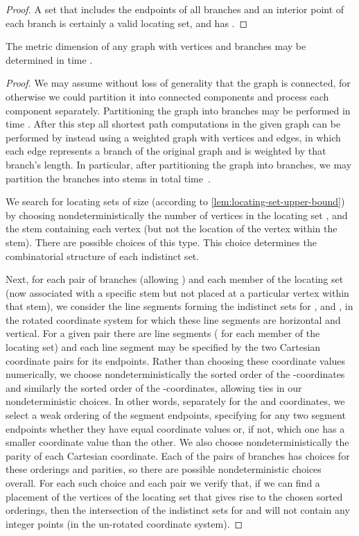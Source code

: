 \documentclass{jgaa-art}
\begin{document}
\begin{proof}
A set  that includes the endpoints of all branches and an interior point of each branch is certainly a valid locating set, and has .
\end{proof}

\begin{theorem}
The metric dimension of any graph with  vertices and  branches may be determined in time .
\end{theorem}

\begin{proof}
We may assume without loss of generality that the graph is connected, for otherwise we could partition it into connected components and process each component separately.
Partitioning the graph into branches may be performed in time . After this step all shortest path computations in the given graph can be performed by instead using a weighted graph with  vertices and edges, in which each edge represents a branch of the original graph and is weighted by that branch's length. In particular, after partitioning the graph into branches, we may partition the branches into stems in total time~.

We search for locating sets of size  (according to \autoref{lem:locating-set-upper-bound})
by choosing nondeterministically the number of vertices in the locating set , and the stem containing each vertex (but not the location of the vertex within the stem). There are  possible choices of this type. This choice determines the combinatorial structure of each indistinct set.

Next, for each pair  of branches (allowing ) and each member  of the locating set (now associated with a specific stem but not placed at a particular vertex within that stem), we consider the line segments forming the indistinct sets for ,  and , in the rotated coordinate system for which these line segments are horizontal and vertical. For a given pair  there are  line segments ( for each member of the locating set) and each line segment may be specified by the two Cartesian coordinate pairs for its endpoints. Rather than choosing these coordinate values numerically, we choose nondeterministically the sorted order of the -coordinates and similarly the sorted order of the -coordinates, allowing ties in our nondeterministic choices. In other words, separately for the  and  coordinates, we select a weak ordering of the segment endpoints, specifying for any two segment endpoints whether they have equal coordinate values or, if not, which one has a smaller coordinate value than the other.
We also choose nondeterministically the parity of each Cartesian coordinate.
Each of the  pairs of branches has  choices for these orderings and parities, so there are  possible nondeterministic choices overall.
For each such choice and each pair  we verify that, if we can find a placement of the vertices of the locating set that gives rise to the chosen sorted orderings, then the intersection of the indistinct sets for  and  will not contain any integer points (in the un-rotated coordinate system).


\end{proof}
\end{document}
